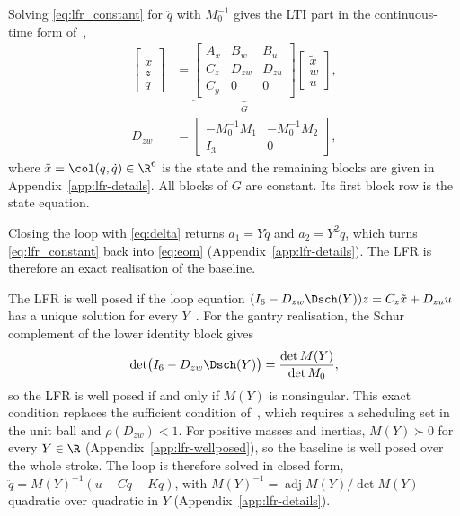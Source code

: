 Solving \eqref{eq:lfr_constant} for $\ddot q$ with $M_0^{-1}$ gives the LTI part
in the continuous-time form of~\cite[Eq.~(2.1)]{drenth2025thesis},
\begin{equation}
\begin{aligned}
  \begin{bmatrix}\dot{\tilde x}\\ z\\ q\end{bmatrix}
  &=\underbrace{\begin{bmatrix}A_x&B_w&B_u\\ C_z&D_{zw}&D_{zu}\\ C_y&0&0\end{bmatrix}}_{G}
  \begin{bmatrix}\tilde x\\ w\\ u\end{bmatrix},\\
  D_{zw}&=\begin{bmatrix}-M_0^{-1}M_1&-M_0^{-1}M_2\\ I_3&0\end{bmatrix},
\end{aligned}
  \label{eq:lfr_G}
\end{equation}
where $\tilde x=\col(q,\dot q)\in\R^6$ is the state and the remaining blocks
are given in Appendix~\ref{app:lfr-details}.
All blocks of $G$ are constant.
Its first block row is the state equation.

Closing the loop with \eqref{eq:delta} returns $a_1=Y\ddot q$ and
$a_2=Y^2\ddot q$, which turns \eqref{eq:lfr_constant} back into \eqref{eq:eom}
(Appendix~\ref{app:lfr-details}).
The LFR is therefore an exact realisation of the baseline.

The LFR is well posed if the loop equation
$(I_6-D_{zw}\Dsch(Y))z=C_z\tilde x+D_{zu}u$ has a unique solution for every
$Y$~\cite[Def.~1]{drenth2025lpvlfr}.
For the gantry realisation, the Schur complement of the lower identity block
gives
\begin{equation}
  \det\bigl(I_6-D_{zw}\Dsch(Y)\bigr)=\frac{\det M(Y)}{\det M_0},
  \label{eq:lfr_det}
\end{equation}
so the LFR is well posed if and only if $M(Y)$ is nonsingular.
This exact condition replaces the sufficient condition
of~\cite[Thm.~6]{drenth2025lpvlfr}, which requires a scheduling set in the
unit ball and $\rho(D_{zw})<1$.
For positive masses and inertias, $M(Y)\succ0$ for every $Y\in\R$
(Appendix~\ref{app:lfr-wellposed}), so the baseline is well posed over the
whole stroke.
The loop is therefore solved in closed form,
$\ddot q=M(Y)^{-1}(u-C\dot q-Kq)$, with
$M(Y)^{-1}=\operatorname{adj}M(Y)/\det M(Y)$ quadratic over quadratic in $Y$
(Appendix~\ref{app:lfr-details}).

